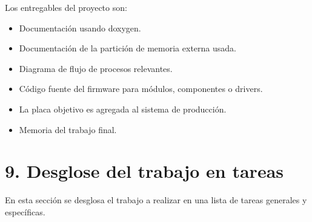 \documentclass[
11pt, %
]{charter}
\begin{document}
Los entregables del proyecto son:

\begin{itemize}
	\item Documentación usando doxygen.
	\item Documentación de la partición de memoria externa usada.
	\item Diagrama de flujo de procesos relevantes.
	\item Código fuente del firmware para módulos, componentes o drivers.
	\item La placa objetivo es agregada al sistema de producción.
	\item Memoria del trabajo final.
\end{itemize}

\section{9. Desglose del trabajo en tareas}
\label{sec:wbs}

En esta sección se desglosa el trabajo a realizar en una lista de tareas generales y específicas.
\end{document}
